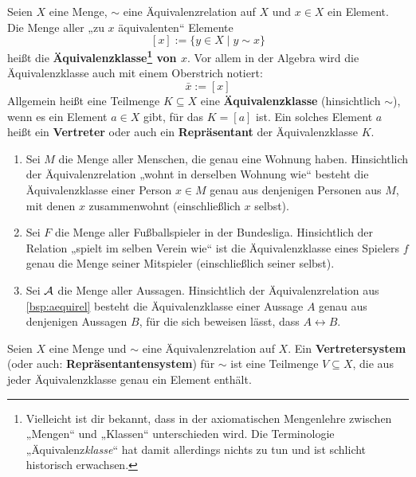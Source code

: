 \begin{de}[Äquivalenzklasse] \label{def:aequiklasse}   
    Seien $X$ eine Menge, $\sim$ eine Äquivalenzrelation auf $X$ und $x\in X$ ein Element. Die Menge aller „zu $x$ äquivalenten“ Elemente
        \[ [x] := \{ y\in X \mid y\sim x \}\]
    heißt die \textbf{Äquivalenzklasse\footnote{Vielleicht ist dir bekannt, dass in der axiomatischen Mengenlehre zwischen „Mengen“ und „Klassen“ unterschieden wird. Die Terminologie „Äquivalenz\emph{klasse}“ hat damit allerdings nichts zu tun und ist schlicht historisch erwachsen.} von $x$}. Vor allem in der Algebra wird die Äquivalenzklasse auch mit einem Oberstrich notiert:
        \[ \bar x := [x]\]
    Allgemein heißt eine Teilmenge $K\subseteq X$ eine \textbf{Äquivalenzklasse} (hinsichtlich ${\sim}$), wenn es ein Element $a\in X$ gibt, für das $K=[a]$ ist. Ein solches Element $a$ heißt ein \textbf{Vertreter} oder auch ein \textbf{Repräsentant} der Äquivalenzklasse $K$.
\end{de}


\begin{bsp} \quad
    \begin{enumerate}
        \item Sei $M$ die Menge aller Menschen, die genau eine Wohnung haben. Hinsichtlich der Äquivalenzrelation „wohnt in derselben Wohnung wie“ besteht die Äquivalenzklasse einer Person $x\in M$ genau aus denjenigen Personen aus $M$, mit denen $x$ zusammenwohnt (einschließlich $x$ selbst).
        \item Sei $F$ die Menge aller Fußballspieler in der Bundesliga. Hinsichtlich der Relation „spielt im selben Verein wie“ ist die Äquivalenzklasse eines Spielers $f$ genau die Menge seiner Mitspieler (einschließlich seiner selbst).
        \item Sei $\mathcal A$ die Menge aller Aussagen. Hinsichtlich der Äquivalenzrelation aus \cref{bsp:aequirel} besteht die Äquivalenzklasse einer Aussage $A$ genau aus denjenigen Aussagen $B$, für die sich beweisen lässt, dass $A\leftrightarrow B$.
    \end{enumerate}
\end{bsp}


\begin{de}[* Vertretersystem]  
    Seien $X$ eine Menge und ${\sim}$ eine Äquivalenzrelation auf $X$. Ein \textbf{Vertretersystem}  (oder auch: \textbf{Repräsentantensystem}) für ${\sim}$ ist eine Teilmenge $V\subseteq X$, die aus jeder Äquivalenzklasse genau ein Element enthält.
\end{de}


